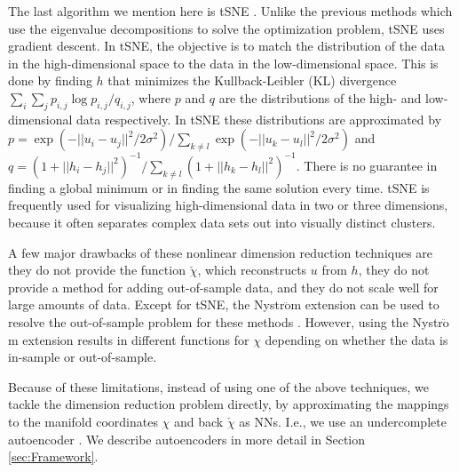 \documentclass[preprint,aps,pre,letterpaper,onecolumn,superscriptaddress]{revtex4-2} %
\begin{document}
The last algorithm we mention here is tSNE \cite{Hinton2003}. Unlike the previous methods which use the eigenvalue decompositions to solve the optimization problem, tSNE uses gradient descent. In tSNE, the objective is to match the distribution of the data in the high-dimensional space to the data in the low-dimensional space. This is done by finding $h$ that minimizes the Kullback-Leibler (KL) divergence $\sum_i \sum_j p_{i,j} \log p_{i,j}/q_{i,j}$, where $p$ and $q$ are the distributions of the high- and low-dimensional data respectively. In tSNE these distributions are approximated by $p=\exp (-||u_i-u_j||^2/2\sigma^2)/\sum_{k\neq l}\exp (-||u_k-u_l||^2/2\sigma^2)$ and $q=(1+||h_i-h_j||^2)^{-1}/\sum_{k\neq l}(1+||h_k-h_l||^2)^{-1}$. 
There is no guarantee in finding a global minimum or in finding the same solution every time. tSNE is frequently used for visualizing high-dimensional data in two or three dimensions, because it often separates complex data sets out into visually distinct clusters.

A few major drawbacks of these nonlinear dimension reduction techniques are they do not provide the function $\check{\chi}$, which reconstructs $u$ from $h$, they do not provide a method for adding out-of-sample data, and they do not scale well for large amounts of data. Except for tSNE, the Nystr$\ddot{\text{o}}$m extension can be used to resolve the out-of-sample problem for these methods \cite{Bengio2004}. However, using the Nystr$\ddot{\text{o}}$m extension results in different functions for $\chi$ depending on whether the data is in-sample or out-of-sample.

Because of these limitations, instead of using one of the above techniques, we tackle the dimension reduction problem directly, by approximating the mappings to the manifold coordinates $\chi$ and back $\check{\chi}$ as NNs. I.e., we use an undercomplete autoencoder \cite{Hinton2006,IanGoodfellowYoshuaBengio2017}. 
We describe autoencoders in more detail in Section \ref{sec:Framework}.
\end{document}
